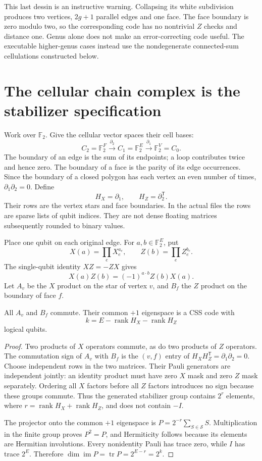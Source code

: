 This last dessin is an instructive warning.  Collapsing its white
subdivision produces two vertices, $2g+1$ parallel edges and one face.
The face boundary is zero modulo two, so the corresponding code has no
nontrivial $Z$ checks and distance one.  Genus alone does not make an
error-correcting code useful.  The executable higher-genus cases instead
use the nondegenerate connected-sum cellulations constructed below.

\section{The cellular chain complex is the stabilizer specification}

Work over $\mathbb F_2$.  Give the cellular vector spaces their cell bases:
\[
 C_2=\mathbb F_2^F\xrightarrow{\partial_2}
 C_1=\mathbb F_2^E\xrightarrow{\partial_1}\mathbb F_2^V=C_0.
\]
The boundary of an edge is the sum of its endpoints; a loop contributes
twice and hence zero.  The boundary of a face is the parity of its edge
occurrences.  Since the boundary of a closed polygon has each vertex an
even number of times, $\partial_1\partial_2=0$.  Define
\[
 H_X=\partial_1,\qquad H_Z=\partial_2^{\mathsf T}.
\]
Their rows are the vertex stars and face boundaries.  In the actual files
the rows are sparse lists of qubit indices.  They are not dense floating
matrices subsequently rounded to binary values.

Place one qubit on each original edge.  For $a,b\in\mathbb F_2^E$, put
\[
 X(a)=\prod_eX_e^{a_e},\qquad Z(b)=\prod_eZ_e^{b_e}.
\]
The single-qubit identity $XZ=-ZX$ gives
\[
 X(a)Z(b)=(-1)^{a\cdot b}Z(b)X(a).
\]
Let $A_v$ be the $X$ product on the star of vertex $v$, and $B_f$ the
$Z$ product on the boundary of face $f$.

\begin{theorem}
All $A_v$ and $B_f$ commute.  Their common $+1$ eigenspace is a CSS
code with
\[
 k=E-\operatorname{rank}H_X-\operatorname{rank}H_Z
\]
logical qubits.
\end{theorem}
\begin{proof}
Two products of $X$ operators commute, as do two products of $Z$
operators.  The commutation sign of $A_v$ with $B_f$ is the $(v,f)$
entry of $H_XH_Z^{\mathsf T}=\partial_1\partial_2=0$.
Choose independent rows in the two matrices.  Their Pauli generators
are independent jointly: an identity product must have zero $X$ mask
and zero $Z$ mask separately.  Ordering all $X$ factors before all $Z$
factors introduces no sign because these groups commute.  Thus the
generated stabilizer group contains $2^r$ elements, where
$r=\operatorname{rank}H_X+\operatorname{rank}H_Z$, and does not contain
$-I$.

The projector onto the common $+1$ eigenspace is
$P=2^{-r}\sum_{S\in\mathcal S}S$.  Multiplication in the finite
group proves $P^2=P$, and Hermiticity follows because its elements
are Hermitian involutions.  Every nonidentity Pauli has trace zero,
while $I$ has trace $2^E$.  Therefore
$\dim\operatorname{im}P=\operatorname{tr}P=2^{E-r}=2^k$.
\end{proof}

